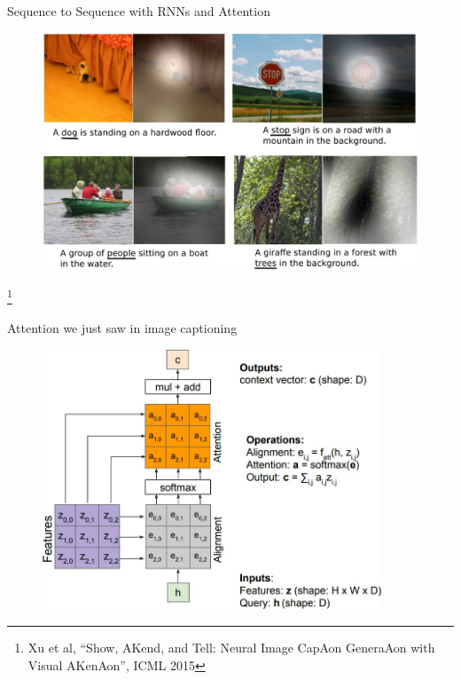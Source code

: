 \begin{frame}[allowframebreaks]{Sequence to Sequence with RNNs and Attention}
    \framebreak

    \begin{figure}
        \centering
        \includegraphics[width=1\textwidth,keepaspectratio]{images/rnn/slide_33_1_img.png}
    \end{figure}
    \footnote{Xu et al, “Show, AKend, and Tell: Neural Image CapAon GeneraAon with Visual AKenAon”, ICML 2015}
\end{frame}


\begin{frame}[allowframebreaks]{Attention we just saw in image captioning}
    \begin{figure}
        \centering
        \includegraphics[width=0.9\textwidth,height=0.9\textheight,keepaspectratio]{images/rnn/slide_34_1_img.jpg}
    \end{figure}
\end{frame}